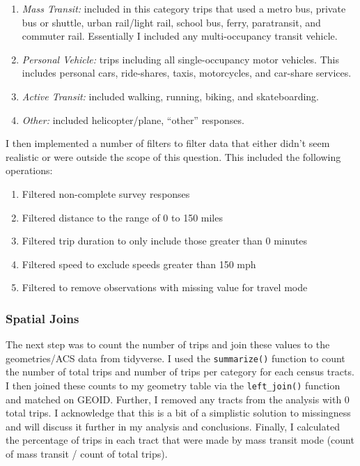 \documentclass[
]{article}
\providecommand{\tightlist}{%
  \setlength{\itemsep}{0pt}\setlength{\parskip}{0pt}}
\begin{document}
\begin{enumerate}
\def\labelenumi{\arabic{enumi}.}
\tightlist
\item
  \emph{Mass Transit:} included in this category trips that used a metro
  bus, private bus or shuttle, urban rail/light rail, school bus, ferry,
  paratransit, and commuter rail. Essentially I included any
  multi-occupancy transit vehicle.
\item
  \emph{Personal Vehicle:} trips including all single-occupancy motor
  vehicles. This includes personal cars, ride-shares, taxis,
  motorcycles, and car-share services.
\item
  \emph{Active Transit:} included walking, running, biking, and
  skateboarding.
\item
  \emph{Other:} included helicopter/plane, ``other'' responses.
\end{enumerate}

I then implemented a number of filters to filter data that either didn't
seem realistic or were outside the scope of this question. This included
the following operations:

\begin{enumerate}
\def\labelenumi{\arabic{enumi}.}
\tightlist
\item
  Filtered non-complete survey responses
\item
  Filtered distance to the range of 0 to 150 miles
\item
  Filtered trip duration to only include those greater than 0 minutes
\item
  Filtered speed to exclude speeds greater than 150 mph
\item
  Filtered to remove observations with missing value for travel mode
\end{enumerate}

\subsubsection{Spatial Joins}\label{spatial-joins}

The next step was to count the number of trips and join these values to
the geometries/ACS data from tidyverse. I used the \texttt{summarize()}
function to count the number of total trips and number of trips per
category for each census tracts. I then joined these counts to my
geometry table via the \texttt{left\_join()} function and matched on
GEOID. Further, I removed any tracts from the analysis with 0 total
trips. I acknowledge that this is a bit of a simplistic solution to
missingness and will discuss it further in my analysis and conclusions.
Finally, I calculated the percentage of trips in each tract that were
made by mass transit mode (count of mass transit / count of total
trips).
\end{document}
